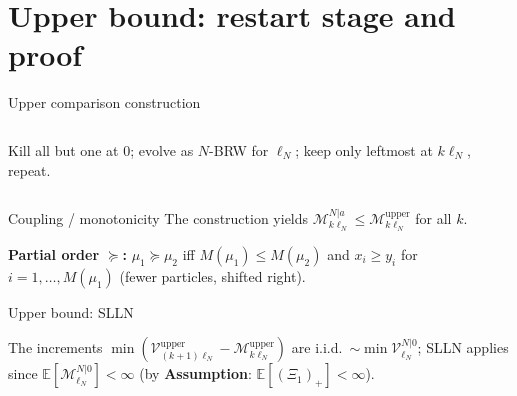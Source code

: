 \documentclass[10pt, aspectratio=169]{beamer}
\newcommand{\E}{\mathbb{E}}
\begin{document}
\section{Upper bound: restart stage and proof}

\begin{frame}{Upper comparison construction}
    \begin{columns}
        \small
        Kill all but one at $0$; evolve as $N$-BRW for $\ell_N$; keep only leftmost at $k\ell_N$, repeat.
        \centering
        \resizebox{\textwidth}{!}{}
    \end{columns}
\end{frame}

\begin{frame}{Coupling / monotonicity}
    \small
    The construction yields $\mathcal M_{k\ell_N}^{N|a}\le \mathcal M_{k\ell_N}^{\mathrm{upper}}$ for all $k$.
    \vspace{1mm}
    
    \textbf{Partial order $\succcurlyeq$:}
    $\mu_1\succcurlyeq\mu_2$ iff $M(\mu_1)\le M(\mu_2)$ and $x_i\ge y_i$ for $i=1,\dots,M(\mu_1)$ (fewer particles, shifted right).
    \vspace{1mm}
    
    
    \vspace{1mm}
    \centering
    \resizebox{0.58\textwidth}{!}{}
\end{frame}

\begin{frame}{Upper bound: SLLN}
    \small
    
    The increments $\min(\mathcal V^{\mathrm{upper}}_{(k+1)\ell_N}-\mathcal M^{\mathrm{upper}}_{k\ell_N})$ are i.i.d.~$\sim\min\mathcal V^{N|0}_{\ell_N}$; SLLN applies since
    $\E[\mathcal M^{N|0}_{\ell_N}]<\infty$ (by \textbf{Assumption}: $\E[(\Xi_1)_+]<\infty$).
\end{frame}
\end{document}
